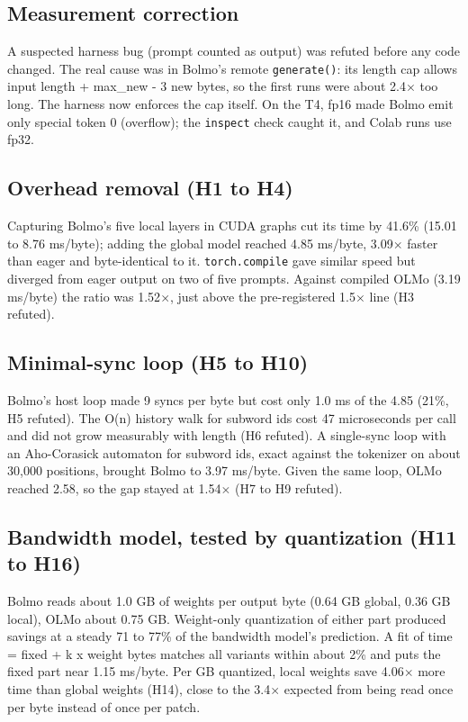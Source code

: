 \documentclass[11pt,a4paper]{article}
\newcommand{\x}{\ensuremath{\times}}
\begin{document}
\subsection{Measurement correction}\label{measurement-correction}

A suspected harness bug (prompt counted as output) was refuted before any code changed. The real cause was in Bolmo's remote \texttt{generate()}: its length cap allows input length + max\_new - 3 new bytes, so the first runs were about 2.4\x{} too long. The harness now enforces the cap itself. On the T4, fp16 made Bolmo emit only special token 0 (overflow); the \texttt{inspect} check caught it, and Colab runs use fp32.

\subsection{Overhead removal (H1 to H4)}\label{overhead-removal-h1-to-h4}

Capturing Bolmo's five local layers in CUDA graphs cut its time by 41.6\% (15.01 to 8.76 ms/byte); adding the global model reached 4.85 ms/byte, 3.09\x{} faster than eager and byte-identical to it. \texttt{torch.compile} gave similar speed but diverged from eager output on two of five prompts. Against compiled OLMo (3.19 ms/byte) the ratio was 1.52\x{}, just above the pre-registered 1.5\x{} line (H3 refuted).

\subsection{Minimal-sync loop (H5 to H10)}\label{minimal-sync-loop-h5-to-h10}

Bolmo's host loop made 9 syncs per byte but cost only 1.0 ms of the 4.85 (21\%, H5 refuted). The O(n) history walk for subword ids cost 47 microseconds per call and did not grow measurably with length (H6 refuted). A single-sync loop with an Aho-Corasick automaton for subword ids, exact against the tokenizer on about 30,000 positions, brought Bolmo to 3.97 ms/byte. Given the same loop, OLMo reached 2.58, so the gap stayed at 1.54\x{} (H7 to H9 refuted).

\subsection{Bandwidth model, tested by quantization (H11 to H16)}\label{bandwidth-model-tested-by-quantization-h11-to-h16}

Bolmo reads about 1.0 GB of weights per output byte (0.64 GB global, 0.36 GB local), OLMo about 0.75 GB. Weight-only quantization of either part produced savings at a steady 71 to 77\% of the bandwidth model's prediction. A fit of time = fixed + k x weight bytes matches all variants within about 2\% and puts the fixed part near 1.15 ms/byte. Per GB quantized, local weights save 4.06\x{} more time than global weights (H14), close to the 3.4\x{} expected from being read once per byte instead of once per patch.
\end{document}
